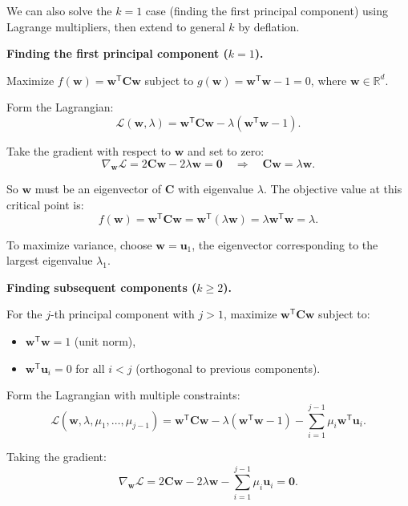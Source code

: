\begin{remark}
  We can also solve the $k=1$ case (finding the first principal component) using Lagrange multipliers, then extend to general $k$ by deflation.

  \textbf{Finding the first principal component ($k=1$).}

  Maximize $f(\mathbf{w}) = \mathbf{w}^{\mathsf{T}}\mathbf{C}\mathbf{w}$ subject to $g(\mathbf{w}) = \mathbf{w}^{\mathsf{T}}\mathbf{w} - 1 = 0$, where $\mathbf{w} \in \mathbb{R}^d$.

  Form the Lagrangian:
  \[
    \mathcal{L}(\mathbf{w}, \lambda) = \mathbf{w}^{\mathsf{T}}\mathbf{C}\mathbf{w} - \lambda(\mathbf{w}^{\mathsf{T}}\mathbf{w} - 1).
  \]

  Take the gradient with respect to $\mathbf{w}$ and set to zero:
  \[
    \nabla_{\mathbf{w}} \mathcal{L} = 2\mathbf{C}\mathbf{w} - 2\lambda\mathbf{w} = \mathbf{0} \quad \Rightarrow \quad \mathbf{C}\mathbf{w} = \lambda\mathbf{w}.
  \]

  So $\mathbf{w}$ must be an eigenvector of $\mathbf{C}$ with eigenvalue $\lambda$. The objective value at this critical point is:
  \[
    f(\mathbf{w}) = \mathbf{w}^{\mathsf{T}}\mathbf{C}\mathbf{w} = \mathbf{w}^{\mathsf{T}}(\lambda\mathbf{w}) = \lambda \mathbf{w}^{\mathsf{T}}\mathbf{w} = \lambda.
  \]

  To maximize variance, choose $\mathbf{w} = \mathbf{u}_1$, the eigenvector corresponding to the largest eigenvalue $\lambda_1$.

  \textbf{Finding subsequent components ($k \geq 2$).}

  For the $j$-th principal component with $j > 1$, maximize $\mathbf{w}^{\mathsf{T}}\mathbf{C}\mathbf{w}$ subject to:
  \begin{itemize}
    \item $\mathbf{w}^{\mathsf{T}}\mathbf{w} = 1$ (unit norm),
    \item $\mathbf{w}^{\mathsf{T}}\mathbf{u}_i = 0$ for all $i < j$ (orthogonal to previous components).
  \end{itemize}

  Form the Lagrangian with multiple constraints:
  \[
    \mathcal{L}(\mathbf{w}, \lambda, \mu_1,\dots,\mu_{j-1}) = \mathbf{w}^{\mathsf{T}}\mathbf{C}\mathbf{w} - \lambda(\mathbf{w}^{\mathsf{T}}\mathbf{w} - 1) - \sum_{i=1}^{j-1} \mu_i \mathbf{w}^{\mathsf{T}}\mathbf{u}_i.
  \]

  Taking the gradient:
  \[
    \nabla_{\mathbf{w}} \mathcal{L} = 2\mathbf{C}\mathbf{w} - 2\lambda\mathbf{w} - \sum_{i=1}^{j-1} \mu_i \mathbf{u}_i = \mathbf{0}.
  \]


\end{remark}
